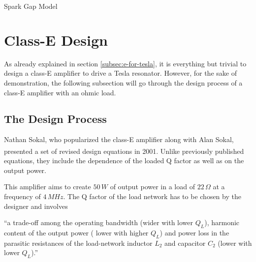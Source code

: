 \begin{marginfigure}
    \centering
    \caption{Spark Gap Model}
    \label{fig:spark-gap-simulation}
\end{marginfigure}

\newpage
\section{Class-E Design}

As already explained in section \ref{subsec:e-for-tesla}, it is everything but trivial to design a class-E amplifier to drive a Tesla resonator. However, for the sake of demonstration, the following subsection will go through the design process of a class-E amplifier with an ohmic load.

\subsection{The Design Process}
\label{subsec:the-design-process}

Nathan Sokal, who popularized the class-E amplifier along with Alan Sokal, presented a set of revised design equations in 2001\textsuperscript{}. Unlike previously published equations, they include the dependence of the loaded Q factor as well as on the output power.

This amplifier aims to create \(50\,W\) of output power in a load of \(22\,\Omega\) at a frequency of \(4\,MHz\). The Q factor of the load network has to be chosen by the designer and involves 

\begin{displayquote}
\enquote{a trade-off among the operating bandwidth (wider with lower \(Q_L\)), harmonic content of the output power (\textelp{} lower with higher \(Q_L\)) and power loss in the parasitic resistances of the load-network inductor \(L_2\) and capacitor \(C_2\) (lower with lower \(Q_L\)).}
\end{displayquote}

